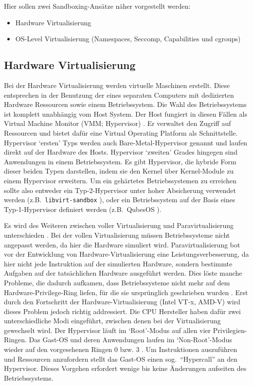 Hier sollen zwei Sandboxing-Ansätze näher vorgestellt werden: 

\begin{itemize}
    \item Hardware Virtualisierung
    \item OS-Level Virtualisierung (Namespaces, Seccomp, Capabilities und cgroups)
\end{itemize}

\subsection{Hardware Virtualisierung}

Bei der Hardware Virtualisierung werden virtuelle Maschinen erstellt. Diese entsprechen in der Benutzung der eines separaten Computers mit dedizierten Hardware Ressourcen sowie einem Betriebssystem. Die Wahl des Betriebssystems ist komplett unabhängig vom Host System. Der Host fungiert in diesen Fällen als Virtual Machine Monitor (VMM; Hypervisor) \cite{uhlig-intel}. Er verwaltet den Zugriff auf Ressourcen und bietet dafür eine Virtual Operating Platform als Schnittstelle.
Hypervisor `ersten' Typs werden auch Bare-Metal-Hypervisor genannt und laufen direkt auf der Hardware des Hosts. Hypervisor `zweiten' Grades hingegen sind Anwendungen in einem Betriebssystem. Es gibt Hypervisor, die hybride Form dieser beiden Typen darstellen, indem sie den Kernel über Kernel-Module zu einem Hypervisor erweitern.
Um ein gehärtetes Betriebssystemen zu erreichen sollte also entweder ein Typ-2-Hypervisor unter hoher Absicherung verwendet werden (z.B.\ \texttt{libvirt-sandbox} \cite{libvirt-sandbox}), oder ein Betriebssystem auf der Basis eines Typ-1-Hypervisor definiert werden (z.B.\ QubesOS \cite{qubes}). 

Es wird des Weiteren zwischen voller Virtualisierung und Paravirtualisierung unterschieden \cite{xen}. Bei der vollen Virtualisierung müssen Betriebssysteme nicht angepasst werden, da hier die Hardware simuliert wird. Paravirtualisierung bot vor der Entwicklung von Hardware-Virtualisierung eine Leistungsverbesserung, da hier nicht jede Instruktion auf der simulierten Hardware, sondern bestimmte Aufgaben auf der tatsächlichen Hardware ausgeführt werden. Dies löste manche Probleme, die
dadurch aufkamen, dass Betriebssysteme nicht mehr auf dem Hardware-Privilege-Ring liefen, für die sie ursprünglich geschrieben wurden \cite{uhlig-intel}. Erst durch den Fortschritt der Hardware-Virtualisierung (Intel VT-x, AMD-V) wird dieses Problem jedoch richtig addressiert. Die CPU Hersteller haben dafür zwei unterschiedliche Modi eingeführt, zwischen denen bei der Virtualisierung gewechselt wird. Der Hypervisor läuft im `Root'-Modus auf allen vier Privilegien-Ringen. Das Gast-OS
und deren Anwendungen laufen im `Non-Root'-Modus wieder auf den vorgesehenen Ringen 0 bzw. 3 \cite{uhlig-intel}. Um Instruktionen auszuführen und Ressourcen anzufordern stellt das Gast-OS einen sog.\ ``Hypercall'' an den Hypervisor. Dieses Vorgehen erfordert wenige bis keine Änderungen aufseiten des Betriebssystems. 

